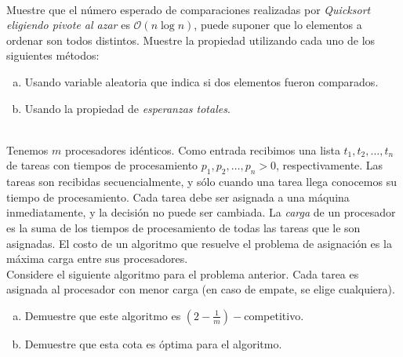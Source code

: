 \documentclass[dcc,uchile]{fcfmcourse}
\theoremstyle{plain}
\theoremstyle{definition}
\begin{document}
\begin{problems}
\\
Muestre que el número esperado de comparaciones realizadas por \textit{Quicksort eligiendo pivote al azar} es $\mathcal{O}(n\log{n})$, puede suponer que lo elementos a ordenar son todos distintos. Muestre la propiedad utilizando cada uno de los siguientes métodos:
\begin{enumerate}[a)]
    \item Usando variable aleatoria que indica si dos elementos fueron comparados.
    \item Usando la propiedad de \textit{esperanzas totales}.
\end{enumerate}
\\
Tenemos $m$ procesadores idénticos. Como entrada recibimos una lista $t_{1}, t_{2}, \ldots, t_{n}$ de tareas con tiempos de procesamiento $p_{1}, p_{2}, \ldots, p_{n} > 0$, respectivamente. Las tareas son recibidas secuencialmente, y sólo cuando una tarea llega conocemos su tiempo de procesamiento. Cada tarea debe ser asignada a una máquina inmediatamente, y la decisión no puede ser cambiada. La \textit{carga} de un procesador es la suma de los tiempos de procesamiento de todas las tareas que le son asignadas. El costo de un algoritmo que resuelve el problema de asignación es la máxima carga entre sus procesadores.\\
Considere el siguiente algoritmo para el problema anterior. Cada tarea es asignada al procesador con menor carga (en caso de empate, se elige cualquiera).
\begin{enumerate}[a)]
    \item Demuestre que este algoritmo es $\left(2-\frac{1}{m}\right)-$competitivo.
    \item Demuestre que esta cota es óptima para el algoritmo.
\end{enumerate}

\end{problems}
\end{document}

